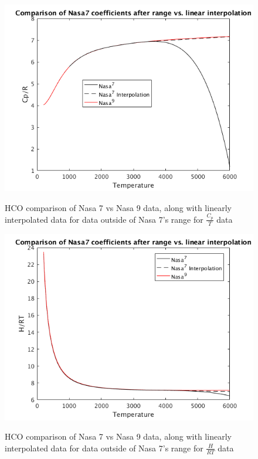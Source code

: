 \documentclass{article}
\begin{document}
  \begin{figure}
  \centering
  \includegraphics[width=\textwidth]{CpT.png}
  \label{fig:cpT}
  \caption{HCO comparison of Nasa 7 vs Nasa 9 data, along with linearly interpolated data for data outside of Nasa 7's range for $\frac{C_p}{T}$ data}
\end{figure}


\begin{figure}
  \centering
  \includegraphics[width=\textwidth]{HT.png}
  \label{fig:HT}
  \caption{HCO comparison of Nasa 7 vs Nasa 9 data, along with linearly interpolated data for data outside of Nasa 7's range for $\frac{H}{RT}$ data}
\end{figure}
\end{document}
